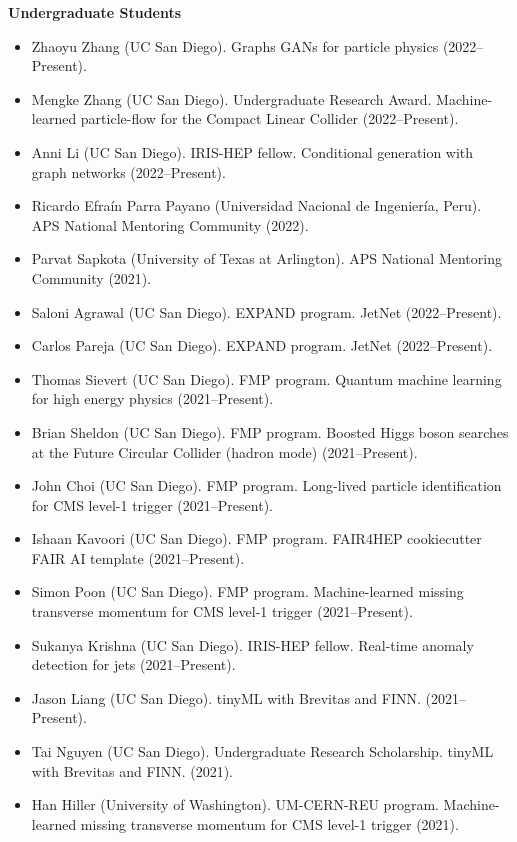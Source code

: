 \documentclass[11pt]{res}
\begin{document}
\begin{resume}
  \textbf{Undergraduate Students}
  \begin{itemize}
    \itemsep-0.3em
    \item Zhaoyu Zhang (UC San Diego). Graphs GANs for particle physics ({2022--Present}).
    \item Mengke Zhang (UC San Diego). Undergraduate Research Award. Machine-learned particle-flow for the Compact Linear Collider ({2022--Present}).
    \item Anni Li (UC San Diego). IRIS-HEP fellow. Conditional generation with graph networks ({2022--Present}).
    \item Ricardo Efra\'{i}n Parra Payano (Universidad Nacional de Ingenier\'{i}a, Peru). APS National Mentoring Community ({2022}).
    \item Parvat Sapkota (University of Texas at Arlington). APS National Mentoring Community ({2021}).
    \item Saloni Agrawal (UC San Diego). EXPAND program. JetNet ({2022--Present}).
    \item Carlos Pareja (UC San Diego). EXPAND program. JetNet ({2022--Present}).
    \item Thomas Sievert (UC San Diego). FMP program. Quantum machine learning for high energy physics ({2021--Present}).
    \item Brian Sheldon (UC San Diego). FMP program. Boosted Higgs boson searches at the Future Circular Collider (hadron mode) ({2021--Present}).
    \item John Choi (UC San Diego). FMP program. Long-lived particle identification for CMS level-1 trigger ({2021--Present}).
    \item Ishaan Kavoori (UC San Diego). FMP program. FAIR4HEP cookiecutter FAIR AI template ({2021--Present}).
    \item Simon Poon (UC San Diego). FMP program. Machine-learned missing transverse momentum for CMS level-1 trigger ({2021--Present}).
    \item Sukanya Krishna (UC San Diego). IRIS-HEP fellow. Real-time anomaly detection for jets ({2021--Present}).
    \item Jason Liang (UC San Diego). tinyML with Brevitas and FINN. ({2021--Present}).
    \item Tai Nguyen (UC San Diego). Undergraduate Research Scholarship. tinyML with Brevitas and FINN. ({2021}).
    \item Han Hiller (University of Washington). UM-CERN-REU program. Machine-learned missing transverse momentum for CMS level-1 trigger ({2021}).

\end{itemize}
\end{resume}
\end{document}
